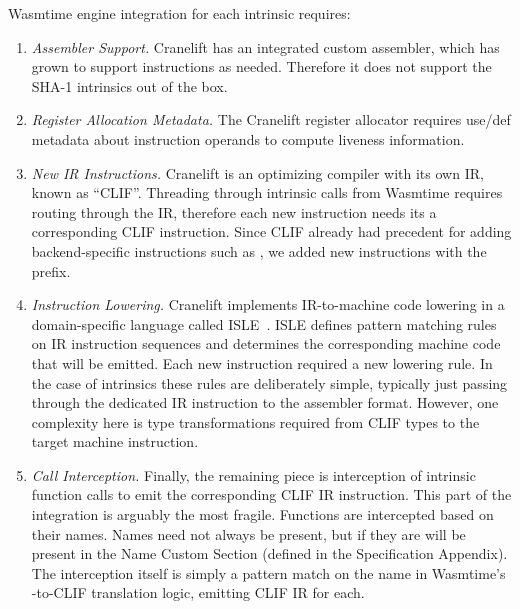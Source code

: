 Wasmtime engine integration for each intrinsic requires:
%
\begin{enumerate}
    \item \emph{Assembler Support.}
        Cranelift has an integrated custom assembler, which has grown to support
        instructions as needed. Therefore it does not support the SHA-1
        intrinsics out of the box.
    \item \emph{Register Allocation Metadata.}
        The Cranelift register allocator requires use/def metadata about
        instruction operands to compute liveness information.
    \item \emph{New IR Instructions.}
        Cranelift is an optimizing compiler with its own IR, known as ``CLIF''.
        Threading through intrinsic calls from Wasmtime requires routing through
        the IR, therefore each new instruction needs its a corresponding CLIF
        instruction. Since CLIF already had precedent for adding
        backend-specific instructions such as , we added new
        instructions with the  prefix.
    \item \emph{Instruction Lowering.}
        Cranelift implements IR-to-machine code lowering in a domain-specific
        language called ISLE~\cite{isle}. ISLE defines pattern matching rules on IR
        instruction sequences and determines the corresponding machine code that
        will be emitted. Each new instruction required a new lowering rule.  In
        the case of intrinsics these rules are deliberately simple, typically
        just passing through the dedicated IR instruction to the assembler
        format.
        However, one complexity here is type transformations required from CLIF
        types to the target machine instruction.
    \item \emph{Call Interception.}
        Finally, the remaining piece is interception of intrinsic function calls
        to emit the corresponding CLIF IR instruction. This part of the
        integration is arguably the most fragile. Functions are intercepted
        based on their names. Names need not always be present, but if they are
        will be present in the Name Custom Section (defined in the \wasml
        Specification Appendix). The interception itself is simply a pattern
        match on the name in Wasmtime's \wasm-to-CLIF translation logic,
        emitting CLIF IR for each.
\end{enumerate}

